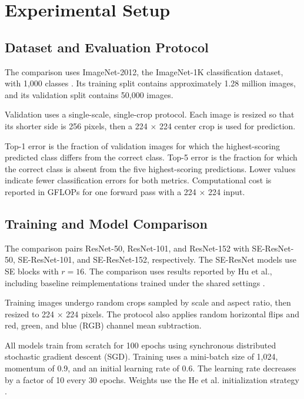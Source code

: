 \section{Experimental Setup}

\subsection{Dataset and Evaluation Protocol}

The comparison uses ImageNet-2012, the ImageNet-1K classification dataset, with 1,000 classes . Its training split contains approximately 1.28 million images, and its validation split contains 50,000 images.

Validation uses a single-scale, single-crop protocol. Each image is resized so that its shorter side is 256 pixels, then a 224 $\times$ 224 center crop is used for prediction.

Top-1 error is the fraction of validation images for which the highest-scoring predicted class differs from the correct class. Top-5 error is the fraction for which the correct class is absent from the five highest-scoring predictions. Lower values indicate fewer classification errors for both metrics. Computational cost is reported in GFLOPs for one forward pass with a 224 $\times$ 224 input.

\subsection{Training and Model Comparison}

The comparison pairs ResNet-50, ResNet-101, and ResNet-152 \cite{he2016resnet} with SE-ResNet-50, SE-ResNet-101, and SE-ResNet-152, respectively. The SE-ResNet models use SE blocks \cite{hu2018squeeze} with $r=16$. The comparison uses results reported by Hu et al., including baseline reimplementations trained under the shared settings \cite{hu2018squeeze}.

Training images undergo random crops sampled by scale and aspect ratio, then resized to 224 $\times$ 224 pixels. The protocol also applies random horizontal flips and red, green, and blue (RGB) channel mean subtraction.

All models train from scratch for 100 epochs using synchronous distributed stochastic gradient descent (SGD). Training uses a mini-batch size of 1,024, momentum of 0.9, and an initial learning rate of 0.6. The learning rate decreases by a factor of 10 every 30 epochs. Weights use the He et al. initialization strategy .
